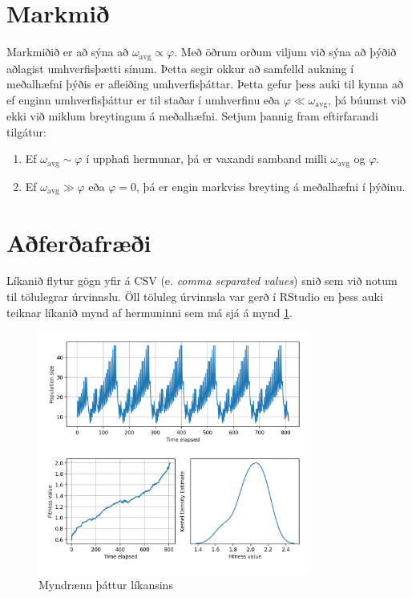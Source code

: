 \documentclass[12pt]{article}
\begin{document}
\section{Markmið}
\noindent Markmiðið er að sýna að $\omega_{\mathrm{avg}} \propto \varphi$. Með öðrum orðum viljum við sýna að þýðið aðlagist umhverfisþætti sínum.
Þetta segir okkur að samfelld aukning í meðalhæfni þýðis er afleiðing umhverfisþáttar. Þetta gefur þess auki til kynna að ef enginn umhverfisþáttur
er til staðar í umhverfinu eða $\varphi \ll \omega_{\mathrm{avg}}$, þá búumst við ekki við miklum breytingum á meðalhæfni. Setjum þannig fram eftirfarandi tilgátur:
\begin{enumerate}
    \item[(1)] Ef $\omega_{\mathrm{avg}} \sim \varphi$ í upphafi hermunar, þá er vaxandi samband milli
    $\omega_{\mathrm{avg}}$ og $\varphi$.
    \item[(2)] Ef $\omega_{\mathrm{avg}} \gg \varphi$ eða $\varphi = 0$, þá er engin markviss breyting á meðalhæfni í þýðinu.
\end{enumerate}

\section{Aðferðafræði}
Líkanið flytur gögn yfir á CSV (e. \emph{comma separated values}) snið sem við notum til tölulegrar úrvinnslu.
Öll töluleg úrvinnsla var gerð í RStudio en þess auki teiknar líkanið mynd af hermuninni sem má sjá á mynd \ref{fig:simulation}.

\begin{figure}[ht!]
    \centering
    \includegraphics[width=0.8\textwidth]{img/sim_visualization.png}
    \caption{Myndrænn þáttur líkansins} \label{fig:simulation}
\end{figure}
\end{document}
